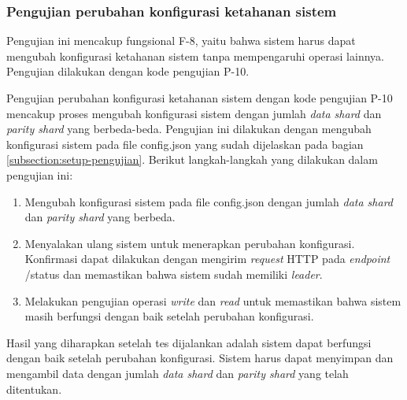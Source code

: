\subsubsection{Pengujian perubahan konfigurasi ketahanan sistem}
\label{subsubsection:pengujian-perubahan-konfigurasi-ketahanan}

Pengujian ini mencakup fungsional F-8, yaitu bahwa sistem harus dapat mengubah konfigurasi ketahanan sistem tanpa mempengaruhi operasi lainnya. Pengujian dilakukan dengan kode pengujian P-10.

Pengujian perubahan konfigurasi ketahanan sistem dengan kode pengujian P-10 mencakup proses mengubah konfigurasi sistem dengan jumlah \textit{data shard} dan \textit{parity shard} yang berbeda-beda. Pengujian ini dilakukan dengan mengubah konfigurasi sistem pada file config.json yang sudah dijelaskan pada bagian \ref{subsection:setup-pengujian}. Berikut langkah-langkah yang dilakukan dalam pengujian ini:

\begin{enumerate}
  \item Mengubah konfigurasi sistem pada file config.json dengan jumlah \textit{data shard} dan \textit{parity shard} yang berbeda.
  \item Menyalakan ulang sistem untuk menerapkan perubahan konfigurasi. Konfirmasi dapat dilakukan dengan mengirim \textit{request} HTTP pada \textit{endpoint} /status dan memastikan bahwa sistem sudah memiliki \textit{leader}.
  \item Melakukan pengujian operasi \textit{write} dan \textit{read} untuk memastikan bahwa sistem masih berfungsi dengan baik setelah perubahan konfigurasi.
\end{enumerate}

Hasil yang diharapkan setelah tes dijalankan adalah sistem dapat berfungsi dengan baik setelah perubahan konfigurasi. Sistem harus dapat menyimpan dan mengambil data dengan jumlah \textit{data shard} dan \textit{parity shard} yang telah ditentukan.
